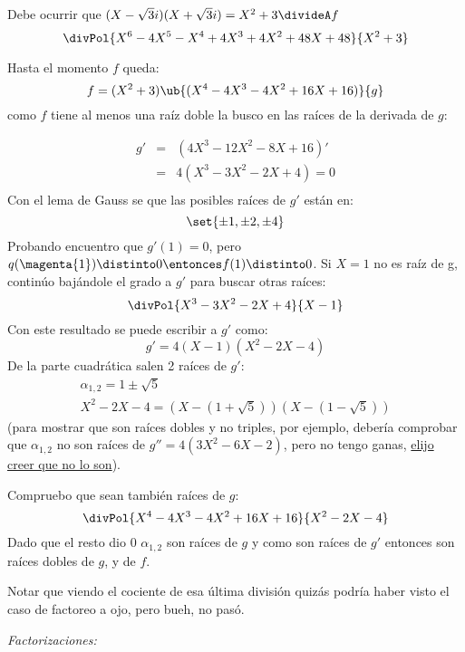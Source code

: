 \begin{enumerate}[label=\alph*)]
        Debe ocurrir que $(X - \sqrt{3}i)(X + \sqrt{3}i) = X^2 + 3 \divideA f$
        $$
          \divPol{X^6 - 4X^5 - X^4 + 4X^3 + 4X^2 + 48X + 48}{X^2 + 3}
        $$

        Hasta el momento $f$ queda:
        $$
          f = (X^2 + 3)\ub{(X^4 - 4X^3 - 4X^2 + 16X + 16)}{g}
        $$
        como $f$ tiene al menos una raíz doble la busco en las raíces de la derivada de $g$:\par
        $$
          \begin{array}{rcl}
            g' & = & (4X^3 - 12X^2 - 8 X + 16)' \\
               & = & 4(X^3 - 3X^2 - 2X + 4) = 0 \\
          \end{array}
        $$
        Con el lema de Gauss se que las posibles raíces de $g'$ están en:
        $$
          \set{\pm1,\pm2,\pm4}
        $$
        Probando encuentro que  $g'(1) = 0$, pero $q(\magenta{1}) \distinto 0 \entonces f(1) \distinto 0$. Si $X=1$ no es raíz de g,
        continúo bajándole el grado a $g'$ para buscar otras raíces:
        $$
          \divPol{X^3 - 3X^2 - 2X + 4}{X - 1}
        $$
        Con este resultado se puede escribir a $g'$ como:
        $$
          g' = 4(X-1)(X^2 - 2X -4)
        $$
        De la parte cuadrática salen 2 raíces de $g'$:
        $$
          \begin{array}{c}
            \alpha_{1,2} = 1 \pm \sqrt{5} \\
            X^2 - 2X -4 = (X - (1 + \sqrt{5}))(X - (1 - \sqrt{5}))
          \end{array}
        $$
        {\tiny(para mostrar que son raíces dobles y no triples, por ejemplo, debería comprobar que $\alpha_{1,2}$ no son raíces de $g''=4(3X^2-6X-2)$, pero no tengo ganas,
            \href{\dontWorryAboutAThing}{elijo creer que no lo son}).}

        Compruebo que sean también raíces de $g$:
        $$
          \divPol{X^4 - 4X^3 - 4X^2 + 16X + 16}{X^2 - 2X -4}
        $$
        Dado que el resto dio 0 $\alpha_{1,2}$ son raíces de $g$ y como son raíces de $g'$ entonces son raíces dobles de $g$, y de $f$.

        Notar que viendo el cociente de esa última división quizás podría haber visto el caso de factoreo a ojo, pero bueh, no pasó.

        \textit{Factorizaciones: }
        \begin{center}
        \end{center}
\end{enumerate}
